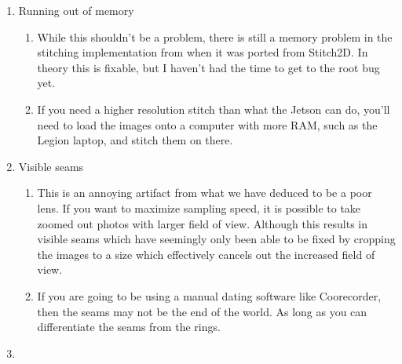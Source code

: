 \documentclass{article}
\begin{document}
\begin{outline}[enumerate]
\begin{enumerate}
    \item Running out of memory
        \begin{enumerate}
        \item While this shouldn't be a problem, there is still a memory problem in the stitching implementation from when it was ported from Stitch2D. In theory this is fixable, but I haven't had the time to get to the root bug yet.
        \item If you need a higher resolution stitch than what the Jetson can do, you'll need to load the images onto a computer with more RAM, such as the Legion laptop, and stitch them on there. 
        \end{enumerate}
    \item Visible seams
        \begin{enumerate}
        \item This is an annoying artifact from what we have deduced to be a poor lens. If you want to maximize sampling speed, it is possible to take zoomed out photos with larger field of view. Although this 
        results in visible seams which have seemingly only been able to be fixed by cropping the images to a size which effectively cancels out the increased field of view.
        \item If you are going to be using a manual dating software like Coorecorder, then the seams may not be the end of the world. As long as you can differentiate the seams from the rings.
        \end{enumerate}
    \item 
    \end{enumerate}
        
\end{outline}
\end{document}
